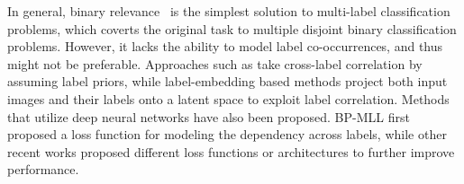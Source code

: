 \documentclass[10pt,twocolumn,letterpaper]{article}
\begin{document}
In general, binary relevance~\cite{Tsoumakas07multi-labelclassification:} is the simplest solution to multi-label classification problems, which coverts the original task to multiple disjoint binary classification problems. However, it lacks the ability to model label co-occurrences, and thus might not be preferable. Approaches such as \cite{Read2011,icml2010_DembczynskiCH10} take cross-label correlation by assuming label priors, while label-embedding based methods \cite{BalasubramanianL12,doi:10.1162/NECO_a_00320,NIPS2012_4561,changpinyo2017predicting,changpinyo2016synthesized} project both input images and their labels onto a latent space to exploit label correlation. Methods that utilize deep neural networks have also been proposed. BP-MLL \cite{1683770} first proposed a loss function for modeling the dependency across labels, while other recent works proposed different loss functions \cite{DBLP:journals/corr/GongJLTI13,DBLP:journals/corr/NamKGF13} or architectures \cite{DBLP:journals/corr/WeiXHNDZY14,Wang_2016_CVPR,yeh2017learning} to further improve performance.
\end{document}
